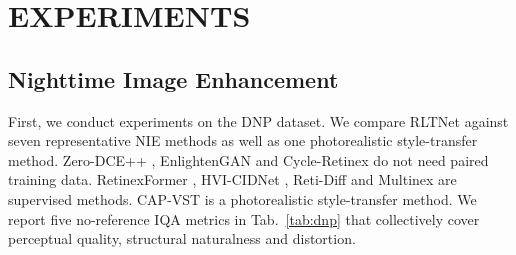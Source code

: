 \documentclass{article}
\begin{document}
\section{EXPERIMENTS}





\subsection{Nighttime Image Enhancement}

First, we conduct experiments on the DNP dataset. We compare RLTNet against seven representative NIE methods as well as one photorealistic style-transfer method. Zero-DCE++ \cite{zero-dceplus}, EnlightenGAN \cite{enlightengan} and Cycle-Retinex \cite{cycleretinex} do not need paired training data. RetinexFormer \cite{retinexformer}, HVI-CIDNet \cite{hvicidnet}, Reti-Diff \cite{retidiff} and Multinex \cite{multinex} are supervised methods. CAP-VST \cite{capvst} is a photorealistic style-transfer method. We report five no-reference IQA metrics in  Tab.~\ref{tab:dnp} that collectively cover perceptual quality, structural naturalness and distortion.
\end{document}
